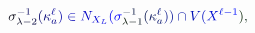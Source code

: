 \documentclass[12pt]{article}
\begin{document}
\makeatletter
\renewcommand*{\@textcolor}[3]{%
  \protect\leavevmode
  \begingroup
    \color#1{#2}#3%
  \endgroup
}
\makeatother
\begin{displaymath}
\mathcolor[RGB]{0,0,15}{\sigma} _ { \mathcolor[RGB]{0,0,30}{\lambda} \mathcolor[RGB]{0,0,45}{-} \mathcolor[RGB]{0,0,60}{2} } ^ { \mathcolor[RGB]{0,0,75}{-} \mathcolor[RGB]{0,0,90}{1} } \mathcolor[RGB]{0,0,105}{(} \mathcolor[RGB]{0,0,120}{\kappa} _ { \mathcolor[RGB]{0,0,135}{a} } ^ { \mathcolor[RGB]{0,0,150}{\ell} } \mathcolor[RGB]{0,0,165}{)} \mathcolor[RGB]{0,0,180}{\in} \mathcolor[RGB]{0,0,195}{N} _ { \mathcolor[RGB]{0,0,210}{X} _ { \mathcolor[RGB]{0,0,225}{L} } } \mathcolor[RGB]{0,0,240}{(} \mathcolor[RGB]{0,0,255}{\sigma} _ { \mathcolor[RGB]{0,15,0}{\lambda} \mathcolor[RGB]{0,15,15}{-} \mathcolor[RGB]{0,15,30}{1} } ^ { \mathcolor[RGB]{0,15,45}{-} \mathcolor[RGB]{0,15,60}{1} } \mathcolor[RGB]{0,15,75}{(} \mathcolor[RGB]{0,15,90}{\kappa} _ { \mathcolor[RGB]{0,15,105}{a} } ^ { \mathcolor[RGB]{0,15,120}{\ell} } \mathcolor[RGB]{0,15,135}{)} \mathcolor[RGB]{0,15,150}{)} \mathcolor[RGB]{0,15,165}{\cap} \mathcolor[RGB]{0,15,180}{V} \mathcolor[RGB]{0,15,195}{(} \mathcolor[RGB]{0,15,210}{X} ^ { \mathcolor[RGB]{0,15,225}{\ell} \mathcolor[RGB]{0,15,240}{-} \mathcolor[RGB]{0,15,255}{1} } \mathcolor[RGB]{0,30,0}{)} \mathcolor[RGB]{0,30,15}{,}
\end{displaymath}
\end{document}
